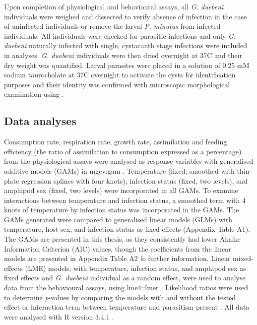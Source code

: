 Upon completion of physiological and behavioural assays, all \emph{G. duebeni} individuals were weighed and dissected to verify absence of infection in the case of uninfected individuals or remove the larval \emph{P. minutus} from infected individuals. All individuals were checked for parasitic infections and only \emph{G. duebeni} naturally infected with single, cystacanth stage infections were included in analyses. \emph{G. duebeni} individuals were then dried overnight at 37\degree C and their dry weight was quantified. Larval parasites were placed in a solution of 0.25 mM sodium taurocholate at 37\degree C overnight to activate the cysts for identification purposes \citep{horvath1969} and their identity was confirmed with microscopic morphological examination using \citet{mcdonald1988}. 

\subsection{Data analyses}

Consumption rate, respiration rate, growth rate, assimilation and feeding efficiency (the ratio of assimilation to consumption expressed as a percentage) from the physiological assays were analysed as response variables with generalised additive models (GAMs) in mgcv:gam \citep{wood2016}.  Temperature (fixed, smoothed with thin-plate regression splines with four knots), infection status (fixed, two levels), and amphipod sex (fixed, two levels) were incorporated in all GAMs. To examine interactions between temperature and infection status, a smoothed term with 4 knots of temperature by infection status was incorporated in the GAMs. The GAMs generated were compared to generalised linear models (GLMs) with temperature, host sex, and infection status as fixed effects (Appendix Table A1). The GAMs are presented in this thesis, as they consistently had lower Akaike Information Criterion (AIC) values, though the coefficients from the linear models are presented in Appendix Table A2 fo further information.
Linear mixed-effects (LME) models, with temperature, infection status, and amphipod sex as fixed effects and \emph{G. duebeni} individual as a random effect, were used to analyse data from the behavioural assays, using lme4::lmer \citep{bates2015}. Likelihood ratios were used to determine \emph{p}-values by comparing the models with and without the tested effect or interaction term between temperature and parasitism present \citep{crawley2012}. All data were analysed with R version 3.4.1 \citep{r2017}.


